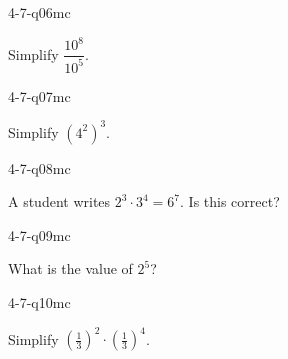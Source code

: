 \begin{practiceQuestion}{4-7-q06}{mc}
\begin{questionText}
Simplify $\dfrac{10^8}{10^5}$.
\end{questionText}
\end{practiceQuestion}

\begin{practiceQuestion}{4-7-q07}{mc}
\begin{questionText}
Simplify $(4^2)^3$.
\end{questionText}
\end{practiceQuestion}

\begin{practiceQuestion}{4-7-q08}{mc}
\begin{questionText}
A student writes $2^3 \cdot 3^4 = 6^7$. Is this correct?
\end{questionText}
\end{practiceQuestion}

\begin{practiceQuestion}{4-7-q09}{mc}
\begin{questionText}
What is the value of $2^5$?
\end{questionText}
\end{practiceQuestion}

\begin{practiceQuestion}{4-7-q10}{mc}
\begin{questionText}
Simplify $\left(\frac{1}{3}\right)^2 \cdot \left(\frac{1}{3}\right)^4$.
\end{questionText}
\end{practiceQuestion}

